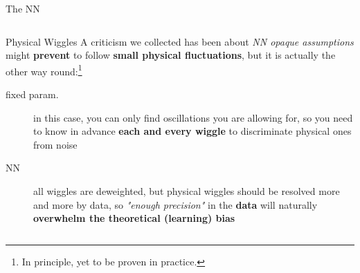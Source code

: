 \documentclass[9pt]{beamer}
\begin{document}
\begin{frame}{The NN}
\begin{columns}
\begin{column}{0.5\textwidth}
            \vspace*{10pt}
            \begin{exampleblock}{Physical Wiggles}
                A criticism we collected has been about \textit{NN opaque
                assumptions} might \textbf{prevent} to follow \textbf{small
                physical fluctuations}, but it is actually the other way
                round:\footnote{In principle, yet to be proven in practice.}

                \begin{description}
                    \item[fixed param.] in this case, you can only find
                        oscillations you are allowing for, so you need to know
                        in advance \textbf{each and every wiggle} to
                        discriminate physical ones from noise
                    \item[NN] all wiggles are deweighted, but physical wiggles
                        should be resolved more and more by data, so
                        \textit{"enough precision"} in the
                        \alert{\textbf{data}} will naturally
                        \textbf{\alert{overwhelm} the theoretical
                        \alert{(learning) bias}}
                \end{description}
            \end{exampleblock}
        \end{column}
    \end{columns}
\end{frame}
\end{document}
